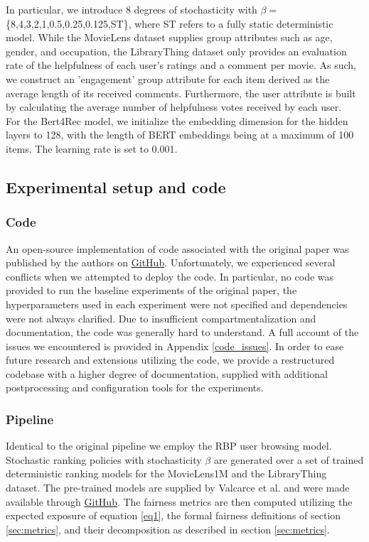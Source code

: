In particular, we introduce 8 degrees of stochasticity with $\beta =$\{8,4,3,2,1,0.5,0.25,0.125,ST\}, where ST refers to a fully static deterministic model. While the MovieLens dataset supplies group attributes such as age, gender, and occupation, the LibraryThing dataset only provides an evaluation rate of the helpfulness of each user's ratings and a comment per movie. As such, we construct an 'engagement' group attribute for each item derived as the average length of its received comments. Furthermore, the user attribute is built by calculating the average number of helpfulness votes received by each user.\\

For the Bert4Rec model, we initialize the embedding dimension for the hidden layers to 128, with the length of BERT embeddings being at a maximum of 100 items. The learning rate is set to 0.001.

\subsection{Experimental setup and code}
\subsubsection{Code} An open-source implementation of code associated with the original paper was published by the authors on \href{https://github.com/haolun-wu/JMEFairness}{GitHub}. Unfortunately, we experienced several conflicts when we attempted to deploy the code. In particular, no code was provided to run the baseline experiments of the original paper, the hyperparameters used in each experiment were not specified and dependencies were not always clarified. Due to insufficient compartmentalization and documentation, the code was generally hard to understand. A full account of the issues we encountered is provided in Appendix \ref{code_issues}. In order to ease future research and extensions utilizing the code, we provide a restructured codebase with a higher degree of documentation, supplied with additional postprocessing and configuration tools for the experiments.

\subsubsection{Pipeline} 
Identical to the original pipeline we employ the RBP user browsing model. Stochastic ranking policies with stochasticity $\beta$ are generated over a set of trained deterministic ranking models for the MovieLens1M and the LibraryThing dataset. The pre-trained models are supplied by Valcarce et al. \cite{Valcarce2018} and were made available through \href{https://github.com/dvalcarce/evalMetrics}{GitHub}. The fairness metrics are then computed utilizing the expected exposure of equation \ref{eq1}, the formal fairness definitions of section \ref{sec:metrics}, and their decomposition as described in section \ref{sec:metrics}. 

